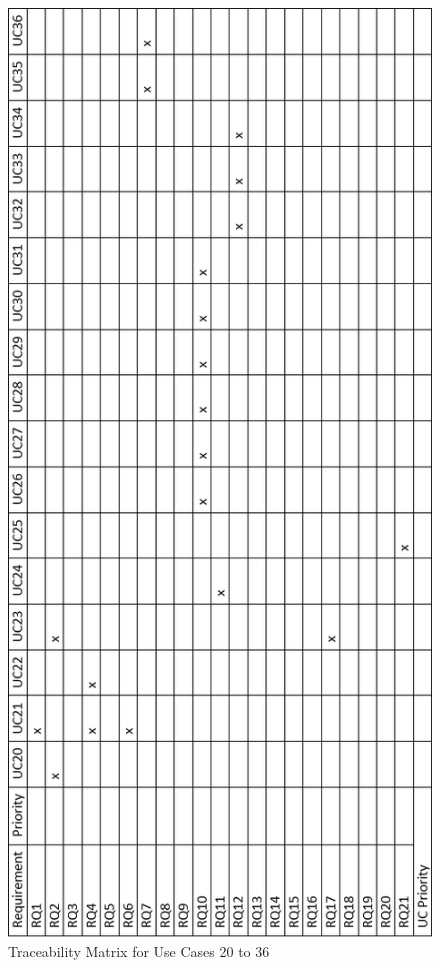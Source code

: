 \documentclass{article}
\begin{document}
{			\begin{figure}[!h]
				\vspace{-3cm}
				\includegraphics[scale=0.70]{Traceability_Matrix_2}
				\caption{Traceability Matrix for Use Cases 20 to 36}
			\end{figure}
			\vfill
			\clearpage
		}
\end{document}
